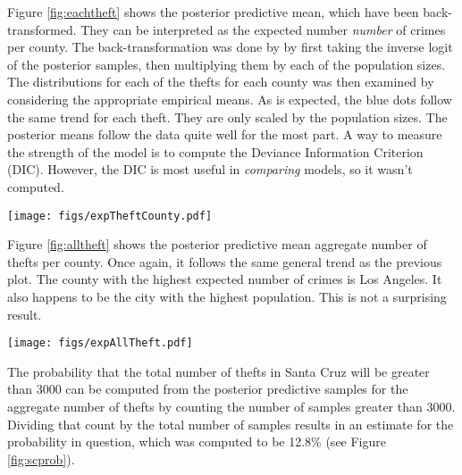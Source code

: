 \documentclass{../../tex_template/asaproc}
\begin{document}
Figure \ref{fig:eachtheft} shows the posterior predictive mean, which have been
back-transformed. They can be interpreted as the expected number
\textit{number} of crimes per county. The back-transformation was done by by
first taking the inverse logit of the posterior samples, then multiplying them
by each of the population sizes. The distributions for each of the thefts for
each county was then examined by considering the appropriate empirical means.
As is expected, the blue dots follow the same trend for each theft. They are
only scaled by the population sizes. The posterior means follow the data quite
well for the most part. A way to measure the strength of the model is to
compute the Deviance Information Criterion (DIC). However, the DIC is most
useful in \textit{comparing} models, so it wasn't computed.

\begin{figure*}
  \centering
  \texttt{[image: figs/expTheftCounty.pdf]}
  \caption{Expected thefts per county. First row: Robbery. Second row:
Burglary. Third row: Larceny. Fourth row: Vehicle Theft. The blue dots are
the posterior means of the original data. The grey lines are the associated 95\% credible intervals.
The red triangles are the data.}
  \label{fig:eachtheft}
\end{figure*}

Figure \ref{fig:alltheft} shows the posterior predictive mean aggregate number
of thefts per county. Once again, it follows the same general trend as the
previous plot. The county with the highest expected number of crimes is Los
Angeles. It also happens to be the city with the highest population. This is
not a surprising result.
\begin{figure*}
  \centering
  \texttt{[image: figs/expAllTheft.pdf]}
  \caption{Total expected thefts per county. The highest expected number of crimes is Los Angeles. It also happens to be the county with the highest population in this data set. The data is ordered in a way such that the aggregate crime is increasing with county.}
  \label{fig:alltheft}
\end{figure*}

The probability that the total number of thefts in Santa Cruz will be greater than 3000 
can be computed from the posterior predictive samples for the aggregate number of thefts
by counting the number of samples greater than 3000. Dividing that count by the total number
of samples results in an estimate for the probability in question, which was computed to be
12.8\% (see Figure \ref{fig:scprob}).
\end{document}
